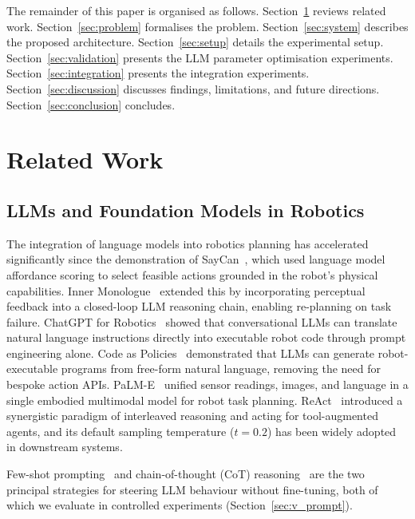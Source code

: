 \documentclass[journal]{IEEEtran}
\begin{document}
The remainder of this paper is organised as follows.
Section~\ref{sec:related} reviews related work.
Section~\ref{sec:problem} formalises the problem.
Section~\ref{sec:system} describes the proposed architecture.
Section~\ref{sec:setup} details the experimental setup.
Section~\ref{sec:validation} presents the LLM parameter optimisation
experiments.
Section~\ref{sec:integration} presents the integration experiments.
Section~\ref{sec:discussion} discusses findings, limitations, and future
directions.
Section~\ref{sec:conclusion} concludes.


\section{Related Work}
\label{sec:related}

\subsection{LLMs and Foundation Models in Robotics}

The integration of language models into robotics planning has accelerated
significantly since the demonstration of SayCan~\cite{ahn2022saycan}, which
used language model affordance scoring to select feasible actions grounded in
the robot's physical capabilities.
Inner Monologue~\cite{huang2022innermonologue} extended this by incorporating
perceptual feedback into a closed-loop LLM reasoning chain, enabling
re-planning on task failure.
ChatGPT for Robotics~\cite{vemprala2023chatgpt} showed that conversational
LLMs can translate natural language instructions directly into executable
robot code through prompt engineering alone.
Code as Policies~\cite{liang2023codepolicies} demonstrated that LLMs can
generate robot-executable programs from free-form natural language, removing
the need for bespoke action APIs.
PaLM-E~\cite{driess2023palme} unified sensor readings, images, and language in
a single embodied multimodal model for robot task planning.
ReAct~\cite{yao2022react} introduced a synergistic paradigm of interleaved
reasoning and acting for tool-augmented agents, and its default sampling
temperature ($t=0.2$) has been widely adopted in downstream systems.

Few-shot prompting~\cite{brown2020gpt3} and chain-of-thought (CoT)
reasoning~\cite{wei2022cot} are the two principal strategies for steering
LLM behaviour without fine-tuning, both of which we evaluate in controlled
experiments (Section~\ref{sec:v_prompt}).
\end{document}
